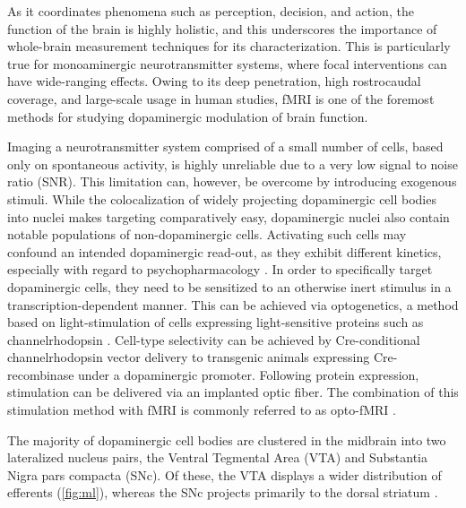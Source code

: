 As it coordinates phenomena such as perception, decision, and action, the function of the brain is highly holistic, and this underscores the importance of whole-brain measurement techniques for its characterization.
This is particularly true for monoaminergic neurotransmitter systems, where focal interventions can have wide-ranging effects.
Owing to its deep penetration, high rostrocaudal coverage, and large-scale usage in human studies, fMRI is one of the foremost methods for studying dopaminergic modulation of brain function.

Imaging a neurotransmitter system comprised of a small number of cells, based only on spontaneous activity, is highly unreliable due to a very low signal to noise ratio (SNR).
This limitation can, however, be overcome by introducing exogenous stimuli.
While the colocalization of widely projecting dopaminergic cell bodies into nuclei makes targeting comparatively easy, dopaminergic nuclei also contain notable populations of non-dopaminergic cells.
Activating such cells may confound an intended dopaminergic read-out, as they exhibit different kinetics, especially with regard to psychopharmacology \cite{Taylor2014}.
In order to specifically target dopaminergic cells, they need to be sensitized to an otherwise inert stimulus in a transcription-dependent manner.
This can be achieved via optogenetics, a method based on light-stimulation of cells expressing light-sensitive proteins such as channelrhodopsin \cite{Boyden2005}.
Cell-type selectivity can be achieved by Cre-conditional channelrhodopsin vector delivery \cite{Orban1992} to transgenic animals expressing Cre-recombinase under a dopaminergic promoter.
Following protein expression, stimulation can be delivered via an implanted optic fiber.
The combination of this stimulation method with fMRI is commonly referred to as opto-fMRI \cite{Desai2011,Grandjean2019}.

The majority of dopaminergic cell bodies are clustered in the midbrain into two lateralized nucleus pairs, the Ventral Tegmental Area (VTA) and Substantia Nigra pars compacta (SNc).
Of these, the VTA displays a wider distribution of efferents (\cref{fig:ml}), whereas the SNc projects primarily to the dorsal striatum \cite{Pan2010}.

